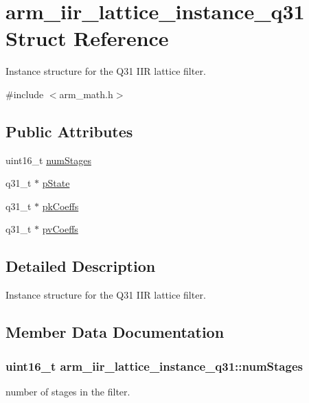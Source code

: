 \hypertarget{structarm__iir__lattice__instance__q31}{}\section{arm\+\_\+iir\+\_\+lattice\+\_\+instance\+\_\+q31 Struct Reference}
\label{structarm__iir__lattice__instance__q31}


Instance structure for the Q31 I\+IR lattice filter.  




{\ttfamily \#include $<$arm\+\_\+math.\+h$>$}

\subsection*{Public Attributes}
\begin{DoxyCompactItemize}
\item 
uint16\+\_\+t \hyperlink{structarm__iir__lattice__instance__q31_a9df4570ed28c50fd9193ab654ff236ad}{num\+Stages}
\item 
q31\+\_\+t $\ast$ \hyperlink{structarm__iir__lattice__instance__q31_a941282745effd26a889fbfadf4b95e6a}{p\+State}
\item 
q31\+\_\+t $\ast$ \hyperlink{structarm__iir__lattice__instance__q31_a1d30aa16aac7722936ea9dee59211863}{pk\+Coeffs}
\item 
q31\+\_\+t $\ast$ \hyperlink{structarm__iir__lattice__instance__q31_a04507e2b982b1dfa97b7b55752dea6b9}{pv\+Coeffs}
\end{DoxyCompactItemize}


\subsection{Detailed Description}
Instance structure for the Q31 I\+IR lattice filter. 

\subsection{Member Data Documentation}
\subsubsection[{\texorpdfstring{num\+Stages}{numStages}}]{\setlength{\rightskip}{0pt plus 5cm}uint16\+\_\+t arm\+\_\+iir\+\_\+lattice\+\_\+instance\+\_\+q31\+::num\+Stages}\hypertarget{structarm__iir__lattice__instance__q31_a9df4570ed28c50fd9193ab654ff236ad}{}\label{structarm__iir__lattice__instance__q31_a9df4570ed28c50fd9193ab654ff236ad}
number of stages in the filter. 
